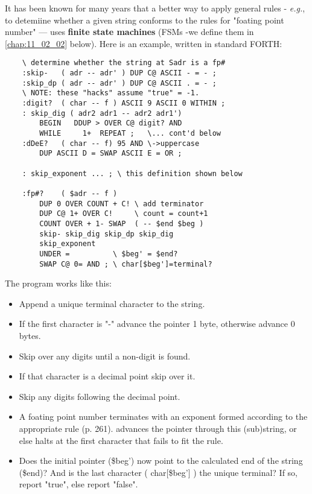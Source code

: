 It has been known for many years that a better way to apply general rules - \textit{e.g.}, to detemiine whether a given string conforms to the rules for "foating point number" --- uses \textbf{finite state machines} (FSMs -we define them in \ref{chap:11_02_02} below). Here is an example, written in standard FORTH:

\begin{lstlisting}
    \ determine whether the string at Sadr is a fp#
    :skip-   ( adr -- adr' ) DUP C@ ASCII - = - ;
    :skip_dp ( adr -- adr' ) DUP C@ ASCII . = - ;
    \ NOTE: these "hacks" assume "true" = -1.
    :digit?  ( char -- f ) ASCII 9 ASCII 0 WITHIN ;
    : skip_dig ( adr2 adr1 -- adr2 adr1')
        BEGIN   DDUP > OVER C@ digit? AND
        WHILE     1+  REPEAT ;   \... cont'd below
    :dDeE?   ( char -- f) 95 AND \->uppercase
        DUP ASCII D = SWAP ASCII E = OR ;

    : skip_exponent ... ; \ this definition shown below

    :fp#?    ( $adr -- f )
        DUP 0 OVER COUNT + C! \ add terminator
        DUP C@ 1+ OVER C!     \ count = count+1
        COUNT OVER + 1- SWAP  ( -- $end $beg )
        skip- skip_dig skip_dp skip_dig
        skip_exponent
        UNDER =          \ $beg' = $end?
        SWAP C@ 0= AND ; \ char[$beg']=terminal?
\end{lstlisting}

The program works like this:

\begin{itemize}
    \item Append a unique terminal character to the string.
    \item If the first character is "-" advance the pointer 1 byte, otherwise advance 0 bytes.
    \item Skip over any digits until a non-digit is found.
    \item If that character is a decimal point skip over it.
    \item Skip any digits following the decimal point.
    \item A foating point number terminates with an exponent formed according to the appropriate rule (p. 261).  advances the pointer through this (sub)string, or else halts at the first character that fails to fit the rule.
    \item Does the initial pointer (\$beg') now point to the calculated end of the string (\$end)? And is the last character ( char[\$beg'] ) the unique terminal? If so, report "true", else report "false".
\end{itemize}

